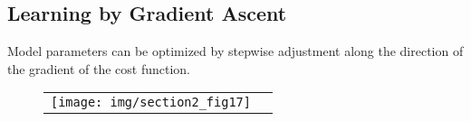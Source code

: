

\subsection{Learning by Gradient Ascent}


\begin{frame}{\secname}
Model parameters can be optimized by stepwise adjustment along the direction of the gradient of the cost function. 

\begin{figure}[h]
  \centering
  \begin{tabular}[c c]{c c}
   \texttt{[image: img/section2\_fig17]}
  &\raisebox{2cm}{$\Delta \mathrm{w}_{ij} = \underbrace{ \eta }_{
    \substack{ \text{learning} \\ \text{rate}} }
  \frac{\partial E^T}{\partial \mathrm{w}_{ij}}$}
  \end{tabular}  
  \label{fig:gradientDescent}
\end{figure}

\end{frame}

